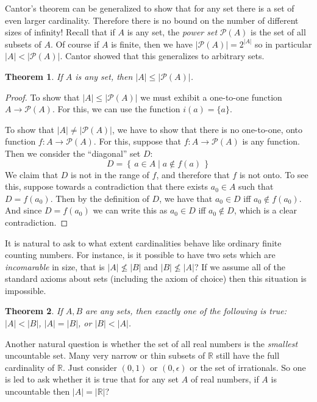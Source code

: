 \documentclass[11pt,oneside]{amsbook}
\newcommand{\set}[1]{\left\{\,#1\,\right\}}
\newcommand{\RR}{\mathbb R}
\theoremstyle{definition}
\theoremstyle{plain}
\newtheorem{thm}{Theorem}[section]
\theoremstyle{definition}
\theoremstyle{remark}
\numberwithin{equation}{section}
\numberwithin{figure}{section}
\begin{document}
Cantor's theorem can be generalized to show that for any set there is a set of even larger cardinality. Therefore there is no bound on the number of different sizes of infinity! Recall that if $A$ is any set, the \emph{power set} $\mathcal P(A)$ is the set of all subsets of $A$. Of course if $A$ is finite, then we have $|\mathcal P(A)|=2^{|A|}$ so in particular $|A|<|\mathcal P(A)|$. Cantor showed that this generalizes to arbitrary sets.

\begin{thm}
  If $A$ is any set, then $|A|\leq|\mathcal P(A)|$.
\end{thm}

\begin{proof}
  To show that $|A|\leq|\mathcal P(A)|$ we must exhibit a one-to-one function $A\to\mathcal P(A)$. For this, we can use the function $i(a)=\{a\}$.

  To show that $|A|\neq|\mathcal P(A)|$, we have to show that there is no one-to-one, onto function $f\colon A\to\mathcal P(A)$. For this, suppose that $f\colon A\to\mathcal P(A)$ is any function. Then we consider the ``diagonal'' set $D$:
  \[D=\set{a\in A\mid a\notin f(a)}
  \]
  We claim that $D$ is not in the range of $f$, and therefore that $f$ is not onto. To see this, suppose towards a contradiction that there exists $a_0\in A$ such that $D=f(a_0)$. Then by the definition of $D$, we have that $a_0\in D$ iff $a_0\notin f(a_0)$. And since $D=f(a_0)$ we can write this as $a_0\in D$ iff $a_0\notin D$, which is a clear contradiction.
\end{proof}

It is natural to ask to what extent cardinalities behave like ordinary finite counting numbers. For instance, is it possible to have two sets which are \emph{incomarable} in size, that is $|A|\not\leq|B|$ and $|B|\not\leq|A|$? If we assume all of the standard axioms about sets (including the axiom of choice) then this situation is impossible.

\begin{thm}
  If $A,B$ are any sets, then exactly one of the following is true: $|A|<|B|$, $|A|=|B|$, or $|B|<|A|$.
\end{thm}

Another natural question is whether the set of all real numbers is the \emph{smallest} uncountable set. Many very narrow or thin subsets of $\RR$ still have the full cardinality of $\RR$. Just consider $(0,1)$ or $(0,\epsilon)$ or the set of irrationals. So one is led to ask whether it is true that for any set $A$ of real numbers, if $A$ is uncountable then $|A|=|\RR|$? 
\end{document}
